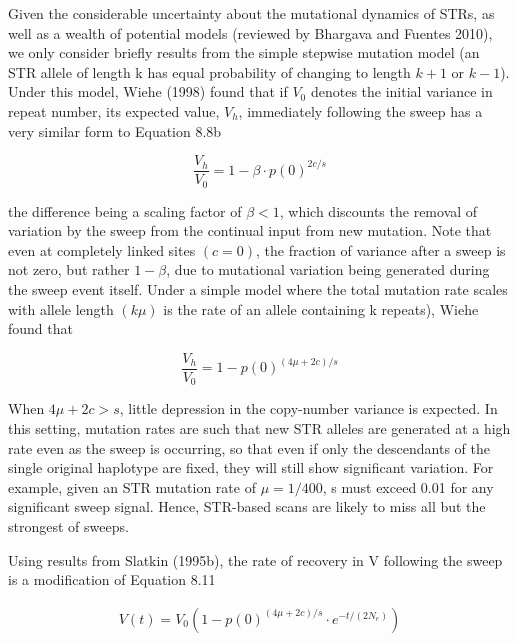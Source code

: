 \documentclass{article}
\begin{document}
Given the considerable uncertainty about the mutational dynamics of STRs, as well as a wealth of potential models (reviewed by Bhargava and Fuentes 2010), we only consider briefly results from the simple stepwise mutation model (an STR allele of length k has equal probability of changing to length  $ k + 1 $ or  $ k - 1 $). Under this model, Wiehe (1998) found that if  $ V_0 $ denotes the initial variance in repeat number, its expected value,  $ V_h $, immediately following the sweep has a very similar form to Equation 8.8b

\begin{equation}
\frac{V_{h}}{V_{0}}=1-\beta\cdot p(0)^{2c/s}
\tag{8.12a}
\label{eq:8_12a}
\end{equation}

the difference being a scaling factor of  $ \beta < 1 $, which discounts the removal of variation by the sweep from the continual input from new mutation. Note that even at completely linked sites  $ (c = 0) $, the fraction of variance after a sweep is not zero, but rather  $ 1 - \beta $, due to mutational variation being generated during the sweep event itself. Under a simple model where the total mutation rate scales with allele length  $ (k\mu) $ is the rate of an allele containing k repeats), Wiehe found that

\begin{equation}
\frac{V_{h}}{V_{0}}=1-p(0)^{(4\mu+2c)/s}
\tag{8.12b}
\label{eq:8_12b}
\end{equation}

When  $ 4\mu + 2c > s $, little depression in the copy-number variance is expected. In this setting, mutation rates are such that new STR alleles are generated at a high rate even as the sweep is occurring, so that even if only the descendants of the single original haplotype are fixed, they will still show significant variation. For example, given an STR mutation rate of  $ \mu = 1/400 $, s must exceed 0.01 for any significant sweep signal. Hence, STR-based scans are likely to miss all but the strongest of sweeps.

Using results from Slatkin (1995b), the rate of recovery in V following the sweep is a modification of Equation 8.11

\begin{equation}
\begin{align*}V(t)=V_0\left(1-p(0)^{(4\mu+2c)/s}\cdot e^{-t/(2N_e)}\right)\end{align*}
\tag{8.12c}
\label{eq:8_12c}
\end{equation}
\end{document}
